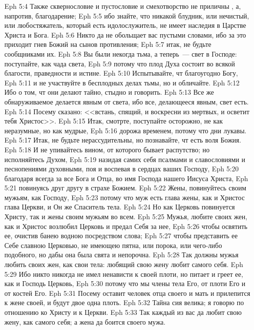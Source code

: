 \vs Eph 5:4 Также сквернословие и пустословие и смехотворство не приличны , а, напротив, благодарение;
\vs Eph 5:5 ибо знайте, что никакой блудник, или нечистый, или любостяжатель, который есть идолослужитель, не имеет наследия в Царстве Христа и Бога.
\vs Eph 5:6 Никто да не обольщает вас пустыми словами, ибо за это приходит гнев Божий на сынов противления;
\vs Eph 5:7 итак, не будьте сообщниками их.
\vs Eph 5:8 Вы были некогда тьма, а теперь~--- свет в Господе: поступайте, как чада света,
\vs Eph 5:9 потому что плод Духа состоит во всякой благости, праведности и истине.
\vs Eph 5:10 Испытывайте, чт благоугодно Богу,
\vs Eph 5:11 и не участвуйте в бесплодных делах тьмы, но и обличайте.
\vs Eph 5:12 Ибо о том, чт они делают тайно, стыдно и говорить.
\vs Eph 5:13 Все же обнаруживаемое делается явным от света, ибо все, делающееся явным, свет есть.
\vs Eph 5:14 Посему сказано: <<встань, спящий, и воскресни из мертвых, и осветит тебя Христос>>.
\rsbpar\vs Eph 5:15 Итак, смотрте, поступайте осторожно, не как неразумные, но как мудрые,
\vs Eph 5:16 дорожа временем, потому что дни лукавы.
\vs Eph 5:17 Итак, не будьте нерассудительны, но познавайте, чт есть воля Божия.
\vs Eph 5:18 И не упивайтесь вином, от которого бывает распутство; но исполняйтесь Духом,
\vs Eph 5:19 назидая самих себя псалмами и славословиями и песнопениями духовными, поя и воспевая в сердцах ваших Господу,
\vs Eph 5:20 благодаря всегда за все Бога и Отца, во имя Господа нашего Иисуса Христа,
\vs Eph 5:21 повинуясь друг другу в страхе Божием.
\rsbpar\vs Eph 5:22 Жены, повинуйтесь своим мужьям, как Господу,
\vs Eph 5:23 потому что муж есть глава жены, как и Христос глава Церкви, и Он же Спаситель тела.
\vs Eph 5:24 Но как Церковь повинуется Христу, так и жены своим мужьям во всем.
\rsbpar\vs Eph 5:25 Мужья, любите своих жен, как и Христос возлюбил Церковь и предал Себя за нее,
\vs Eph 5:26 чтобы освятить ее, очистив банею водною посредством слова;
\vs Eph 5:27 чтобы представить ее Себе славною Церковью, не имеющею пятна, или порока, или чего-либо подобного, но дабы она была свята и непорочна.
\vs Eph 5:28 Так должны мужья любить своих жен, как свои тела: любящий свою жену любит самого себя.
\vs Eph 5:29 Ибо никто никогда не имел ненависти к своей плоти, но питает и греет ее, как и Господь Церковь,
\vs Eph 5:30 потому что мы члены тела Его, от плоти Его и от костей Его.
\vs Eph 5:31 Посему оставит человек отца своего и мать и прилепится к жене своей, и будут двое одна плоть.
\vs Eph 5:32 Тайна сия велика; я говорю по отношению ко Христу и к Церкви.
\vs Eph 5:33 Так каждый из вас да любит свою жену, как самого себя; а жена да боится своего мужа.
